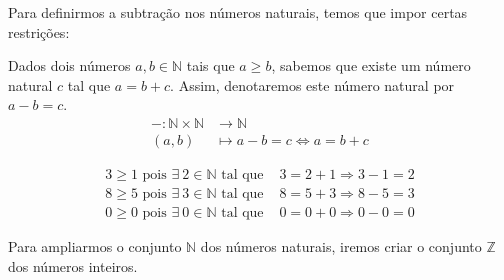 Para definirmos a subtração nos números naturais, temos que impor certas restrições:
\begin{df}
Dados dois números $a,b \in \mathbb{N}$ tais que $a\ge b$, sabemos que existe um número natural $c$ tal que $a=b+c$. Assim, denotaremos este número natural por $a-b=c$.
\begin{align*}
- : \mathbb{N}\times\mathbb{N}&\rightarrow\mathbb{N}\\
(a,b)&\mapsto a-b=c\Leftrightarrow a=b+c
\end{align*} \end{df}
\begin{exemplo}
\begin{align*}
3\ge 1 \textrm{ pois }\exists\: 2 \in\mathbb{N}\textrm{ tal que }& 3=2+1 \Rightarrow 3-1=2\\
8\ge 5 \textrm{ pois }\exists\: 3 \in\mathbb{N}\textrm{ tal que }& 8=5+3 \Rightarrow 8-5=3\\
0\ge 0 \textrm{ pois }\exists\: 0 \in\mathbb{N}\textrm{ tal que }& 0=0+0 \Rightarrow 0-0=0
\end{align*}
\end{exemplo}
Para ampliarmos o conjunto $\mathbb{N}$ dos números naturais, iremos criar o conjunto $\mathbb{Z}$ dos números inteiros. \par 

